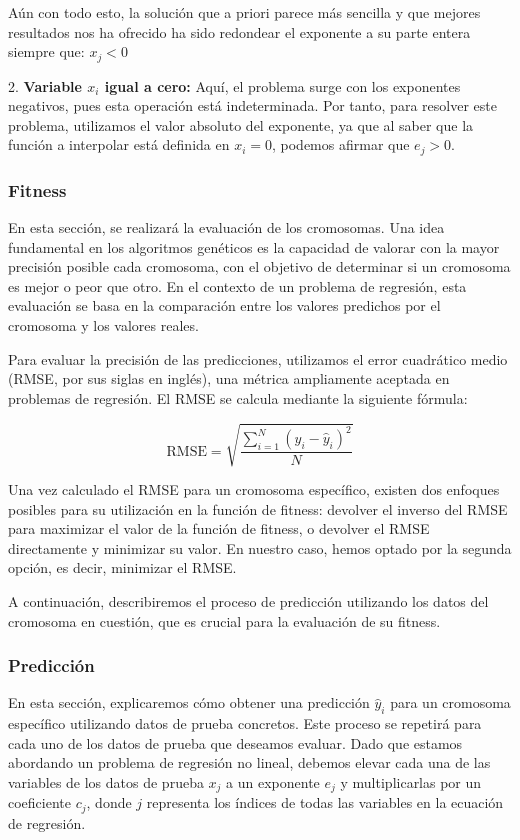 \documentclass[conference,a4paper]{IEEEtran}
\begin{document}
Aún con todo esto, la solución que a priori parece más sencilla y que mejores resultados nos ha ofrecido ha sido redondear el exponente a su parte entera siempre que: \(x_j < 0\) 




2. \textbf{Variable \( x_i \) igual a cero:} Aquí, el problema surge con los exponentes negativos, pues esta operación está indeterminada. Por tanto, para resolver este problema, utilizamos el valor absoluto del exponente, ya que al saber que la función a interpolar está definida en \( x_i = 0 \), podemos afirmar que \( e_j > 0 \).


\subsubsection{Fitness}
En esta sección, se realizará la evaluación de los cromosomas. Una idea fundamental en los algoritmos genéticos es la capacidad de valorar con la mayor precisión posible cada cromosoma, con el objetivo de determinar si un cromosoma es mejor o peor que otro. En el contexto de un problema de regresión, esta evaluación se basa en la comparación entre los valores predichos por el cromosoma y los valores reales.

Para evaluar la precisión de las predicciones, utilizamos el error cuadrático medio (RMSE, por sus siglas en inglés), una métrica ampliamente aceptada en problemas de regresión. El RMSE se calcula mediante la siguiente fórmula:

\[
\text{RMSE} = \sqrt{\frac{\sum_{i=1}^{N} (y_i - \hat{y}_i)^2}{N}}
\]


Una vez calculado el RMSE para un cromosoma específico, existen dos enfoques posibles para su utilización en la función de fitness: devolver el inverso del RMSE para maximizar el valor de la función de fitness, o devolver el RMSE directamente y minimizar su valor. En nuestro caso, hemos optado por la segunda opción, es decir, minimizar el RMSE.

A continuación, describiremos el proceso de predicción utilizando los datos del cromosoma en cuestión, que es crucial para la evaluación de su fitness.

\subsubsection{Predicción}
En esta sección, explicaremos cómo obtener una predicción \(\hat{y}_i\) para un cromosoma específico utilizando datos de prueba concretos. Este proceso se repetirá para cada uno de los datos de prueba que deseamos evaluar. Dado que estamos abordando un problema de regresión no lineal, debemos elevar cada una de las variables de los datos de prueba \(x_j\) a un exponente \(e_j\) y multiplicarlas por un coeficiente \(c_j\), donde \(j\) representa los índices de todas las variables en la ecuación de regresión. 
\end{document}
